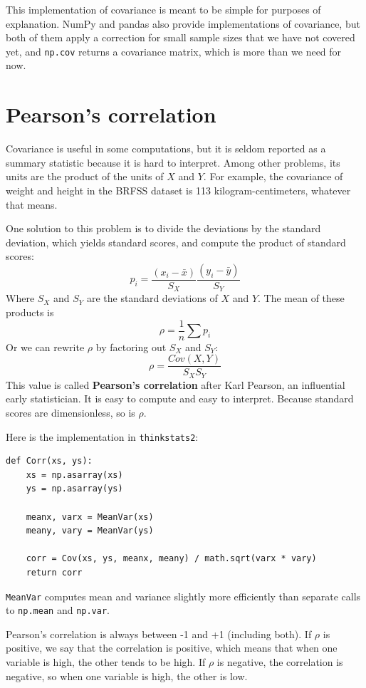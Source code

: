 \documentclass[12pt]{book}
\newcommand{\xbar}{\bar{x}}
\newcommand{\ybar}{\bar{y}}
\theoremstyle{exercise}
\begin{document}
This implementation of covariance is meant to be simple for purposes
of explanation.  NumPy and pandas also provide implementations of
covariance, but both of them apply a correction for small sample sizes
that we have not covered yet, and {\tt np.cov} returns a covariance
matrix, which is more than we need for now.%


\section{Pearson's correlation}%
%

Covariance is useful in some computations, but it is seldom reported
as a summary statistic because it is hard to interpret.  Among other
problems, its units are the product of the units of $X$ and $Y$.  For
example, the covariance of weight and height in the BRFSS dataset is
113 kilogram-centimeters, whatever that means.%
%

One solution to this problem is to divide the deviations by the standard
deviation, which yields standard scores, and compute the product of
standard scores:
%
\[ p_i = \frac{(x_i - \xbar)}{S_X} \frac{(y_i - \ybar)}{S_Y} \]
%
Where $S_X$ and $S_Y$ are the standard deviations of $X$ and $Y$.
The mean of these products is%
%
\[ \rho = \frac{1}{n} \sum p_i \]
%
Or we can rewrite $\rho$ by factoring out $S_X$ and
$S_Y$:
%
\[ \rho = \frac{Cov(X,Y)}{S_X S_Y} \]
%
This value is called {\bf Pearson's correlation} after Karl Pearson,
an influential early statistician.  It is easy to compute and easy to
interpret.  Because standard scores are dimensionless, so is $\rho$.%
%

Here is the implementation in {\tt thinkstats2}:

\begin{verbatim}
def Corr(xs, ys):
    xs = np.asarray(xs)
    ys = np.asarray(ys)

    meanx, varx = MeanVar(xs)
    meany, vary = MeanVar(ys)

    corr = Cov(xs, ys, meanx, meany) / math.sqrt(varx * vary)
    return corr
\end{verbatim}

{\tt MeanVar} computes mean and variance slightly more efficiently
than separate calls to {\tt np.mean} and {\tt np.var}.%

Pearson's correlation is always between -1 and +1 (including both).
If $\rho$ is positive, we say that the correlation is positive,
which means that when one variable is high, the other tends to be
high.  If $\rho$ is negative, the correlation is negative, so
when one variable is high, the other is low.
\end{document}
